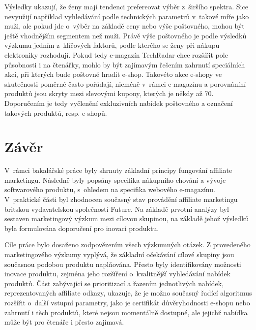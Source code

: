\documentclass[12pt,twoside,openany]{fithesis}
\makeatletter
\def\cleardoublepage{\clearpage\if@twoside \ifodd\c@page\else
        \thispagestyle{empty}
        \hbox{}\newpage\if@twocolumn\hbox{}\newpage\fi\fi\fi}
\makeatother
\begin{document}
                          Výsledky ukazují, že ženy mají tendenci 
prefereovat výběr z~širšího spektra. Sice nevyužijí například 
vyhledávání podle technických parametrů v~takové míře jako muži, ale 
pokud jde o~výběr na základě ceny nebo výše poštovného, mohou být 
ještě vhodnějším segmentem než muži. Právě výše poštovného je 
podle výsledků výzkumu jedním z~klíčových faktorů, podle kterého se 
ženy při nákupu elektroniky rozhodují. Pokud tedy e-magazín TechRadar chce 
rozšířit pole působnosti i na čtenářky, mohlo by být zajímavým 
řešením zahrnutí speciálních akcí, při kterých bude poštovné hradit 
e-shop. Takovéto akce e-shopy ve skutečnosti poměrně často pořádají, 
nicméně v~rámci e-magazínu a porovnáníní produktů jsou skryty mezi 
slevovými kupony, kterých je někdy až 70. Doporučením je tedy 
vyčlenění exkluzivních nabídek poštovného a označení takových 
produktů, resp. e-shopů.

\cleardoublepage
{}
{}
\chapter*{Závěr}
\markright{\contentsname}



                          V~rámci bakalářské práce byly shrnuty základní 
principy fungování affiliate marketingu. Následně byly popsány specifika 
nákupního chování a vývoje softwarového produktu, s~ohledem na specifika 
webového e-magazínu. V~praktické části byl zhodnocen současný stav 
provádění affiliate marketingu britskou vydavatelskou společností Future. 
Na základě prvotní analýzy byl sestaven marketingový výzkum mezi cílovou 
skupinou, na základě jehož výsledků byla formulována doporučení pro 
inovaci produktu.

Cíle práce bylo dosaženo zodpovězením všech výzkumných otázek. Z provedeného marketingového
výzkumy vyplývá, že základní očekávání 
cílové skupiny jsou současnou podobou produktu naplňována. Přesto byly 
identifikovány možnosti inovace produktu, zejména jeho rozšíření 
o~kvalitnější vyhledávání nabídek produktů. Část zabývající se 
prioritizací a řazením jednotlivých nabídek, reprezentovaných affiliate 
odkazy, ukazuje, že je možno současný řadící algoritmus rozšířit 
o~další vstupní parametry, jako je certifikát důvěryhodnosti e-shopu nebo 
zahrnutí i těch produktů, které nejsou momentálně dostupné, ale jejichž 
nabídka může být pro čtenáře i přesto zajímavá.
\end{document}
